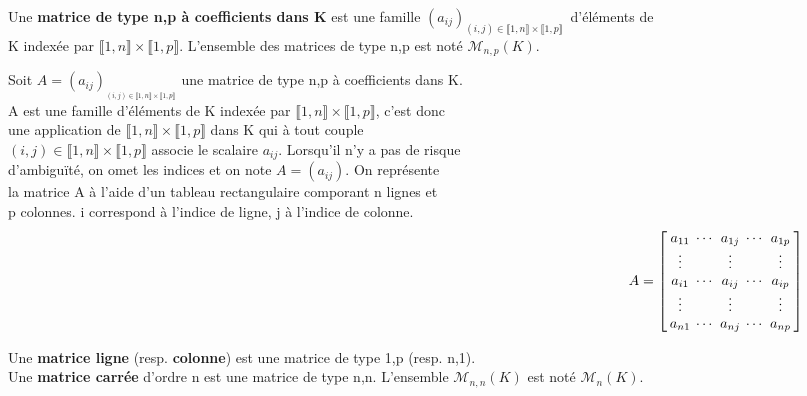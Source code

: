 Une \textbf{matrice de type n,p à coefficients dans K} est une famille \((a_{ij})_{(i,j)\in \llbracket 1,n \rrbracket \times \llbracket 1,p \rrbracket }\,\) d'éléments de\vspace{0.2cm}\\
K indexée par \(\llbracket 1,n \rrbracket \times \llbracket 1,p \rrbracket\). L'ensemble des matrices de type n,p est noté \(\mathcal{M}_{n,p}(K)\).\vspace{0.5cm}\\
\begin{small}
    Soit \(A= (a_{ij})_{_{(i,j)\in \llbracket 1,n \rrbracket \times \llbracket 1,p \rrbracket }}\) une matrice de type n,p à coefficients dans K.\vspace{0.1cm}\\
    A est une famille d'éléments de K indexée par \(\llbracket 1,n \rrbracket \times \llbracket 1,p \rrbracket\), c'est donc \\
    une application de \(\llbracket 1,n \rrbracket \times \llbracket 1,p \rrbracket\) dans K qui à tout couple\\ 
    \((i,j)\in \llbracket 1,n \rrbracket \times \llbracket 1,p \rrbracket\) associe le scalaire \(a_{ij}\). Lorsqu'il n'y a pas de risque \\
    d'ambiguïté, on omet les indices et on note \(A=(a_{ij})\). On représente\\
    la matrice A à l'aide d'un tableau rectangulaire comporant n lignes et \\
    p colonnes. i correspond à l'indice de ligne, j à l'indice de colonne. \vspace{-3.3cm}
    \[\hspace{14cm} \arraycolsep=0.07cm\def\arraystretch{1}  A=\left[\begin{array}{ccccc}
        a_{11} & \cdots & a_{1j} & \cdots & a_{1p} \\
        \vdots & & \vdots & & \vdots \\
        a_{i1} & \cdots & a_{ij} & \cdots & a_{ip} \\
        \vdots & & \vdots & & \vdots \\
        a_{n1} & \cdots & a_{nj} & \cdots & a_{np} \\
    \end{array} \right]\]
\end{small}

\vspace{0.7cm}

\noindent Une \textbf{matrice ligne} (resp. \textbf{colonne}) est une matrice de type 1,p (resp. n,1).\\
Une \textbf{matrice carrée} d'ordre n est une matrice de type n,n. L'ensemble \(\mathcal{M}_{n,n}(K)\) est noté \(\mathcal{M}_n(K)\).

